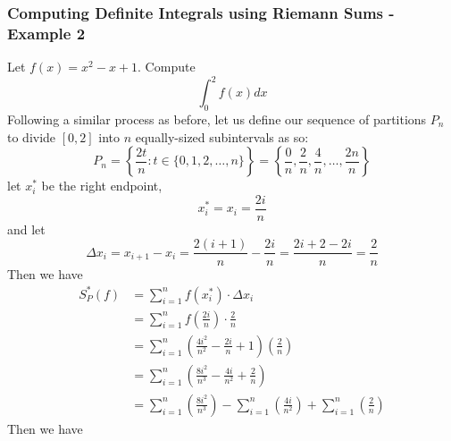 \documentclass[10pt]{article}
\begin{document}
\subsubsection{Computing Definite Integrals using Riemann Sums - Example 2}
Let $f(x)=x^2-x+1$. Compute
$$
    \int_0^2 f(x)dx
$$
Following a similar process as before, let us define our sequence of partitions $P_n$ to divide $[0,2]$ into $n$ equally-sized subintervals as so:
$$
    P_n=\left\{\frac{2t}{n}:t\in\{0,1,2,\dots,n\}\right\}=\left\{\frac{0}{n},\frac{2}{n},\frac{4}{n},\dots,\frac{2n}{n}\right\}
$$
let $x_i^*$ be the right endpoint,
$$x_i^*=x_i=\frac{2i}{n}$$
and let
$$
    \Delta x_i=x_{i+1}-x_i=\frac{2(i+1)}{n}-\frac{2i}{n}=\frac{2i+2-2i}{n}=\frac{2}{n}
$$
Then we have
$$
    \begin{aligned}
        S_P^*(f) & =\sum_{i=1}^n f(x_i^*)\cdot\Delta x_i                                                                                   \\
                 & =\sum_{i=1}^n f\left(\frac{2i}{n}\right)\cdot\frac{2}{n}                                                                \\
                 & =\sum_{i=1}^n\left(\frac{4i^2}{n^2}-\frac{2i}{n}+1\right)\left(\frac{2}{n}\right)                                       \\
                 & =\sum_{i=1}^n\left(\frac{8i^2}{n^3}-\frac{4i}{n^2}+\frac{2}{n}\right)                                                   \\
                 & =\sum_{i=1}^n\left(\frac{8i^2}{n^3}\right)-\sum_{i=1}^n\left(\frac{4i}{n^2}\right)+\sum_{i=1}^n\left(\frac{2}{n}\right)
    \end{aligned}
$$
Then we have
\end{document}
